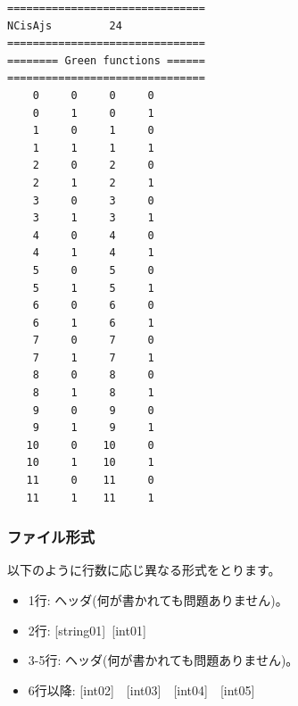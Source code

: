 \begin{minipage}{12.5cm}
\begin{screen}
\begin{verbatim}
===============================
NCisAjs         24
===============================
======== Green functions ======
===============================
    0     0     0     0
    0     1     0     1
    1     0     1     0
    1     1     1     1
    2     0     2     0
    2     1     2     1
    3     0     3     0
    3     1     3     1
    4     0     4     0
    4     1     4     1
    5     0     5     0
    5     1     5     1
    6     0     6     0
    6     1     6     1
    7     0     7     0
    7     1     7     1
    8     0     8     0
    8     1     8     1
    9     0     9     0
    9     1     9     1
   10     0    10     0
   10     1    10     1
   11     0    11     0
   11     1    11     1
\end{verbatim}
\end{screen}
\end{minipage}

\subsubsection{ファイル形式}
以下のように行数に応じ異なる形式をとります。
 \begin{itemize}
   \item  1行:  ヘッダ(何が書かれても問題ありません)。
   \item  2行:   [string01]~[int01]
   \item  3-5行:  ヘッダ(何が書かれても問題ありません)。
   \item  6行以降: [int02]~~[int03]~~[int04]~~[int05]
  \end{itemize}
